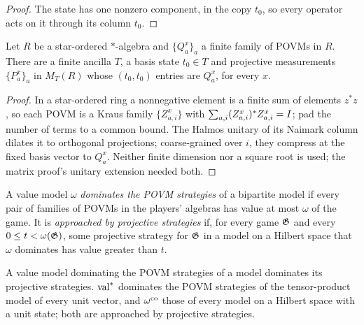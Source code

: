 \begin{proof}
\leanok
The state has one nonzero component, in the copy $t_0$, so every operator acts on it through its
column $t_0$.
\end{proof}

\begin{lemma}
\label{lem:kraus-dilation}
\leanok
Let $R$ be a star-ordered $*$-algebra and $\{Q^x_a\}_a$ a finite family of POVMs in $R$. There are
a finite ancilla $T$, a basis state $t_0 \in T$ and projective measurements $\{P^x_{a}\}_a$ in
$M_T(R)$ whose $(t_0, t_0)$ entries are $Q^x_a$, for every $x$.
\end{lemma}

\begin{proof}
\leanok
In a star-ordered ring a nonnegative element is a finite sum of elements $z^* z$, so each POVM is a
Kraus family $\{Z^x_{a,i}\}$ with $\sum_{a,i} (Z^x_{a,i})^* Z^x_{a,i} = I$; pad the number of terms
to a common bound. The Halmos unitary of its Naimark column dilates it to orthogonal projections;
coarse-grained over $i$, they compress at the fixed basis vector to $Q^x_a$. Neither finite
dimension nor a square root is used; the matrix proof's unitary extension needed both.
\end{proof}

\begin{definition}
\label{def:povm-domination}
\leanok
A value model $\omega$ \emph{dominates the POVM strategies} of a bipartite model if every pair of
families of POVMs in the players' algebras has value at most $\omega$ of the game. It is
\emph{approached by projective strategies} if, for every game $\mathfrak{G}$ and every $0 \leq t <
\omega(\mathfrak{G})$, some projective strategy for $\mathfrak{G}$ in a model on a Hilbert space that $\omega$
dominates has value greater than $t$.
\end{definition}

\begin{lemma}
\label{lem:povm-domination}
\leanok
A value model dominating the POVM strategies of a model dominates its projective strategies.
$\mathrm{val}^*$ dominates the POVM strategies of the tensor-product model of every unit vector, and
$\omega^{\mathrm{co}}$ those of every model on a Hilbert space with a unit state; both are approached by
projective strategies.
\end{lemma}


